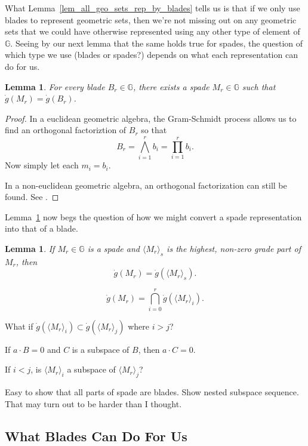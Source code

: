 \documentclass{birkjour}
\newtheorem{lem}[thm]{Lemma}
\theoremstyle{definition}
\theoremstyle{remark}
\numberwithin{equation}{section}
\newcommand{\G}{\mathbb{G}}
\newcommand{\gd}{\dot{g}}
\begin{document}
What Lemma~\ref{lem_all_geo_sets_rep_by_blades} tells us is that if we only use blades to represent geometric sets, then we're not missing out on any geometric sets
that we could have otherwise represented using any other type of element of $\G$.  Seeing by our next
lemma that the same holds true for spades, the question of which type we use (blades or spades?) depends
on what each representation can do for us.

\begin{lem}\label{lem_convert_blade_to_spade}
For every blade $B_r\in\G$, there exists a spade $M_r\in\G$ such that $\gd(M_r)=\gd(B_r)$.
\end{lem}
\begin{proof}
In a euclidean geometric algebra, the Gram-Schmidt process allows us to find an orthogonal factoriztion
of $B_r$ so that
\begin{equation*}
B_r = \bigwedge_{i=1}^r b_i = \prod_{i=1}^r b_i.
\end{equation*}
Now simply let each $m_i=b_i$.

In a non-euclidean geometric algebra, an orthogonal factorization can still be found.
See \cite[p. 88]{Doran03}.
\end{proof}

Lemma~\ref{lem_convert_blade_to_spade} now begs the question of how we might convert a spade representation into that of a blade.

\begin{lem}
If $M_r\in\G$ is a spade and $\langle M_r\rangle_s$ is the highest, non-zero grade part of $M_r$, then
\begin{equation*}
\gd(M_r) = \gd(\langle M_r\rangle_s).
\end{equation*}
\end{lem}

\begin{equation*}
\gd(M_r) = \bigcap_{i=0}^r \gd(\langle M_r\rangle_i).
\end{equation*}

What if $\gd(\langle M_r\rangle_i)\subset\gd(\langle M_r\rangle_j)$ where $i>j$?

If $a\cdot B=0$ and $C$ is a subspace of $B$, then $a\cdot C=0$.

If $i<j$, is $\langle M_r\rangle_i$ a subspace of $\langle M_r\rangle_j$?

Easy to show that all parts of spade are blades.  Show nested subspace sequence.  That may turn out to be harder than I thought.

\subsection{What Blades Can Do For Us}
\end{document}
